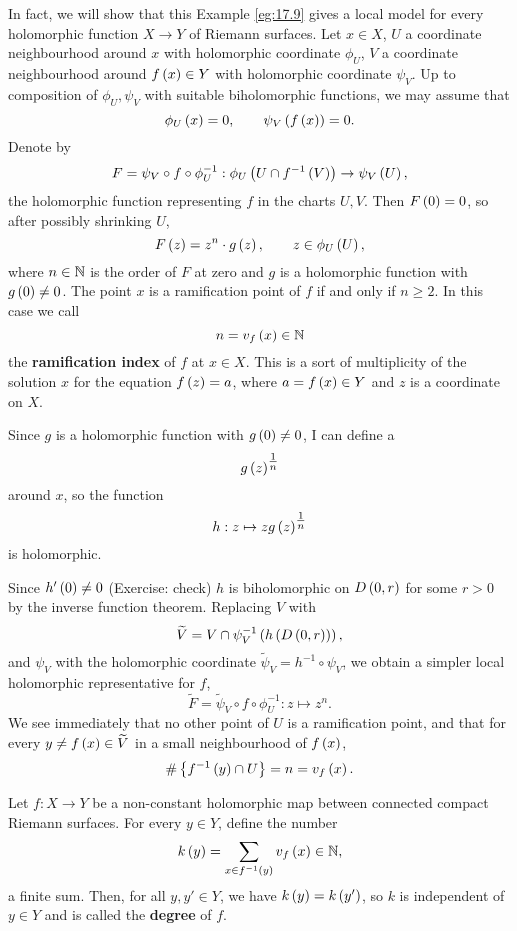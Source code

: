 In fact, we will show that this Example \ref{eg:17.9} gives a local model for every holomorphic function $ X \to Y $ of Riemann surfaces. Let $ x \in X $, $ U $ a coordinate neighbourhood around $ x $ with holomorphic coordinate $ \phi_U $, $ V $ a coordinate neighbourhood around $ f\left( x \right) \in Y $ with holomorphic coordinate $ \psi_V $. Up to composition of $ \phi_U, \psi_V $ with suitable biholomorphic functions, we may assume that
$$ \phi_U\left( x \right) = 0, \qquad \psi_V\left( f\left( x \right) \right) = 0. $$
Denote by
$$ F = \psi_V \circ f \circ \phi_U^{-1} : \phi_U\left( U \cap f^{-1}\left( V \right) \right) \to \psi_V\left( U \right), $$
the holomorphic function representing $ f $ in the charts $ U, V $. Then $ F\left( 0 \right) = 0 $, so after possibly shrinking $ U $,
$$ F\left( z \right) = z^n \cdot g\left( z \right), \qquad z \in \phi_U\left( U \right), $$
where $ n \in \mathbb{N} $ is the order of $ F $ at zero and $ g $ is a holomorphic function with $ g\left( 0 \right) \ne 0 $. The point $ x $ is a ramification point of $ f $ if and only if $ n \ge 2 $. In this case we call
$$ n = v_f\left( x \right) \in \mathbb{N} $$
the \textbf{ramification index} of $ f $ at $ x \in X $. This is a sort of multiplicity of the solution $ x $ for the equation $ f\left( z \right) = a $, where $ a = f\left( x \right) \in Y $ and $ z $ is a coordinate on $ X $.

\begin{note*}
Since $ g $ is a holomorphic function with $ g\left( 0 \right) \ne 0 $, I can define a
$$ g\left( z \right)^{\tfrac{1}{n}} $$
around $ x $, so the function
$$ h : z \mapsto zg\left( z \right)^{\tfrac{1}{n}} $$
is holomorphic.
\end{note*}

Since $ h'\left( 0 \right) \ne 0 $ (Exercise: check) $ h $ is biholomorphic on $ D\left( 0, r \right) $ for some $ r > 0 $ by the inverse function theorem. Replacing $ V $ with
$$ \widetilde{V} = V \cap \psi_V^{-1}\left( h\left( D\left( 0, r \right) \right) \right), $$
and $ \psi_V $ with the holomorphic coordinate $ \widetilde{\psi}_V = h^{-1} \circ \psi_V $, we obtain a simpler local holomorphic representative for $ f $,
$$ \widetilde{F} = \widetilde{\psi}_V \circ f \circ \phi_U^{-1} : z \mapsto z^n. $$
We see immediately that no other point of $ U $ is a ramification point, and that for every $ y \ne f\left( x \right) \in \widetilde{V} $ in a small neighbourhood of $ f\left( x \right) $,
$$ \#\left\{ f^{-1}\left( y \right) \cap U \right\} = n = v_f\left( x \right). $$

\begin{lemma}
Let $ f : X \to Y $ be a non-constant holomorphic map between connected compact Riemann surfaces. For every $ y \in Y $, define the number
$$ k\left( y \right) = \sum_{x \in f^{-1}\left( y \right)} v_f\left( x \right) \in \mathbb{N}, $$
a finite sum. Then, for all $ y, y' \in Y $, we have $ k\left( y \right) = k\left( y' \right) $, so $ k $ is independent of $ y \in Y $ and is called the \textbf{degree} of $ f $.
\end{lemma}

